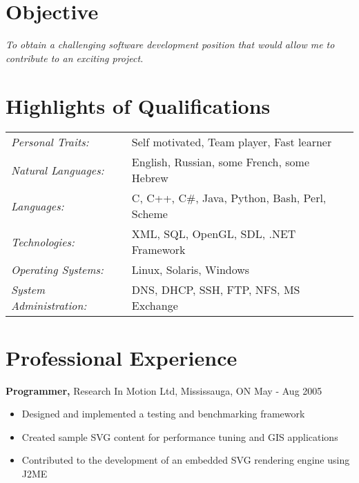 \documentclass[11pt,margin,centered]{res}
\begin{document}
 


\address{{\bf UBC Computer Science Co-op Program} \\ Tel: (604) 822-9677 \\ 
Fax: (604) 822-9676 }
\address{{\bf } \\ Email: science.coop@ubc.ca \\ Web:
www.sciencecoop.ubc.ca }


\begin{resume} 

    \section{Objective}
    \emph{To obtain a challenging software development position that would allow
    me to contribute to an exciting project.}

    \section{Highlights of Qualifications}
    \begin{tabular}{ll}
	\textsl{Personal Traits:}   & Self motivated, Team player, Fast learner \\
	\textsl{Natural Languages:} & English, Russian, some French, some Hebrew \\
	\textsl{Languages:}	    & C, C++, C\#, Java, Python, Bash, Perl, Scheme\\
	\textsl{Technologies:}	    & XML, SQL, OpenGL, SDL, .NET Framework\\
	\textsl{Operating Systems:} & Linux, Solaris, Windows\\
	\textsl{System Administration:}    & DNS, DHCP, SSH, FTP, NFS, MS Exchange\\
    \end{tabular}
\end{resume} 

\section{Professional Experience}

{\bf Programmer,} Research In Motion Ltd, Mississauga, ON \hfill May - Aug 2005
\begin{itemize} \itemsep -1pt
    \item Designed and implemented a testing and benchmarking framework 
    \item Created sample SVG content for performance tuning and GIS applications
    \item Contributed to the development of an embedded SVG rendering
	engine using J2ME
\end{itemize}
\end{document}
